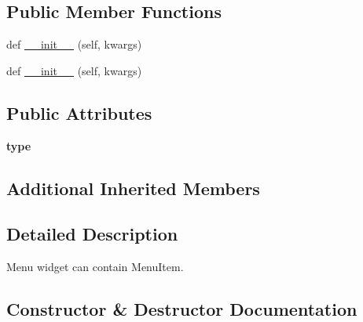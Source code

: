 \subsection*{Public Member Functions}
\begin{DoxyCompactItemize}
\item 
def \hyperlink{classremi_1_1gui_1_1Menu_abbb21fd1b50adcb8898058f13dcaabb9}{\+\_\+\+\_\+init\+\_\+\+\_\+} (self, kwargs)
\item 
def \hyperlink{classremi_1_1gui_1_1Menu_abbb21fd1b50adcb8898058f13dcaabb9}{\+\_\+\+\_\+init\+\_\+\+\_\+} (self, kwargs)
\end{DoxyCompactItemize}
\subsection*{Public Attributes}
\begin{DoxyCompactItemize}
\item 
{\bfseries type}\hypertarget{classremi_1_1gui_1_1Menu_ae639f6472ec437dee250cc579bccf2ed}{}\label{classremi_1_1gui_1_1Menu_ae639f6472ec437dee250cc579bccf2ed}

\end{DoxyCompactItemize}
\subsection*{Additional Inherited Members}


\subsection{Detailed Description}
\begin{DoxyVerb}Menu widget can contain MenuItem.\end{DoxyVerb}
 

\subsection{Constructor \& Destructor Documentation}

